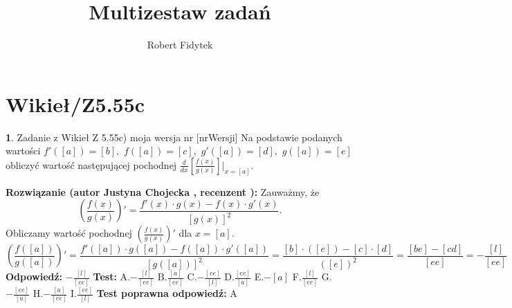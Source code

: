 \documentclass[12pt, a4paper]{article}
\title{Multizestaw zadań}
\author{Robert Fidytek}
\date{}
\theoremstyle{definition} %
\newtheorem{zad}{}
\newcommand{\kategoria}[1]{\section{#1}} %
\newcommand{\zadStart}[1]{\begin{zad}#1\newline} %
\newcommand{\zadStop}{\end{zad}}   %
\newcommand{\rozwStart}[2]{\noindent \textbf{Rozwiązanie (autor #1 , recenzent #2): }\newline} %
\newcommand{\rozwStop}{\newline}                                            %
\newcommand{\odpStart}{\noindent \textbf{Odpowiedź:}\newline}    %
\newcommand{\odpStop}{\newline}                                             %
\newcommand{\testStart}{\noindent \textbf{Test:}\newline} %
\newcommand{\testStop}{\newline} %
\newcommand{\kluczStart}{\noindent \textbf{Test poprawna odpowiedź:}\newline} %
\newcommand{\kluczStop}{\newline} %
\begin{document}
\maketitle


\kategoria{Wikieł/Z5.55c}
\zadStart{Zadanie z Wikieł Z 5.55c) moja wersja nr [nrWersji]}
Na podstawie podanych wartości $f'([a])=[b],$ $f([a])=[c],$ $g'([a])=[d],$ $g([a])=[e]$ obliczyć wartość następującej pochodnej $\frac{d}{dx}\left[\frac{f(x)}{g(x)}\right]\big|_{x=[a]}$.
\zadStop
\rozwStart{Justyna Chojecka}{}
Zauważmy, że 
$$\left(\frac{f(x)}{g(x)}\right)'=\frac{f'(x)\cdot g(x)-f(x)\cdot g'(x)}{\left[g(x)\right]^{2}}.$$
Obliczamy wartość pochodnej $\left(\frac{f(x)}{g(x)}\right)'$ dla $x=[a]$.
$$\left(\frac{f([a])}{g([a])}\right)'=\frac{f'([a])\cdot g([a])-f([a])\cdot g'([a])}{\left[g([a])\right]^{2}}=\frac{[b]\cdot ([e]) - [c]\cdot [d]}{([e])^{2}}=\frac{[be]-[cd]}{[ee]}=-\frac{[l]}{[ee]}$$
\rozwStop
\odpStart
$-\frac{[l]}{[ee]}$
\odpStop
\testStart
A.$-\frac{[l]}{[ee]}$
B.$\frac{[a]}{[ee]}$
C.$-\frac{[ee]}{[l]}$
D.$\frac{[ee]}{[a]}$
E.$-[a]$
F.$\frac{[l]}{[ee]}$
G.$-\frac{[ee]}{[a]}$
H.$-\frac{[a]}{[ee]}$
I.$\frac{[ee]}{[l]}$
\testStop
\kluczStart
A
\kluczStop
\end{document}
